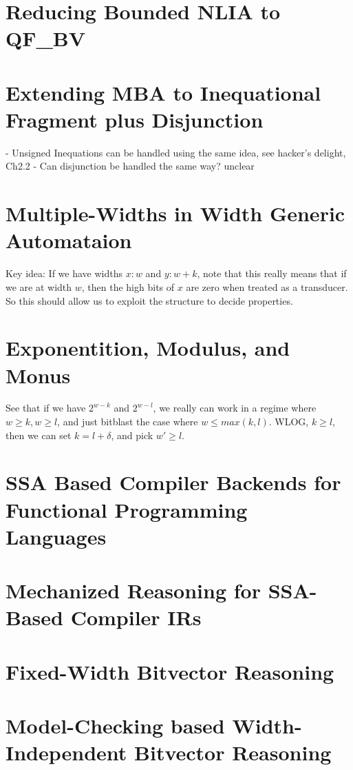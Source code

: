 \documentclass[withindex,glossary]{cam-thesis}
\begin{document}
\chapter{Reducing Bounded NLIA to QF\_BV}

\chapter{Extending MBA to Inequational Fragment plus Disjunction}

- Unsigned Inequations can be handled using the same idea, see hacker's delight, Ch2.2
- Can disjunction be handled the same way? unclear

\chapter{Multiple-Widths in Width Generic Automataion}

Key idea: If we have widths $x : w$ and $ y : w+k$, note that this really means that
if we are at width $w$, then the high bits of $x$ are zero when treated as a transducer.
So this should allow us to exploit the structure to decide properties.

\chapter{Exponentition, Modulus, and Monus}

See that if we have $2^{w-k}$ and $2^{w - l}$, we really can work in a regime where $w \geq k, w \geq l$,
and just bitblast the case where $w \leq max(k, l)$.
WLOG, $k \geq l$, then we can set $k = l + \delta$, and pick $w' \geq l$.

\chapter{SSA Based Compiler Backends for Functional Programming Languages}


\chapter{Mechanized Reasoning for SSA-Based Compiler IRs}

\chapter{Fixed-Width Bitvector Reasoning}

\chapter{Model-Checking based Width-Independent Bitvector Reasoning}
\end{document}
